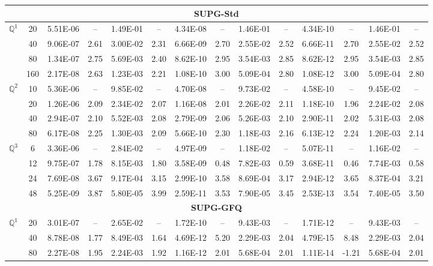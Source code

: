 \documentclass[a4paper,10pt]{article}
\begin{document}
\begin{table}
\begin{tabular}{c|c|cc|cc|cc|cc|cc|cc}
		\multicolumn{14}{c}{\textbf{SUPG-Std}} \\
		\hline
		$\mathbb{Q}^1$ & 20 & 5.51E-06 & --   & 1.49E-01 & --   & 4.34E-08 & --   & 1.46E-01 & --   & 4.34E-10 & --   & 1.46E-01 & --    \\
		& 40 & 9.06E-07 & 2.61 & 3.00E-02 & 2.31 & 6.66E-09 & 2.70 & 2.55E-02 & 2.52 & 6.66E-11 & 2.70 & 2.55E-02 & 2.52  \\
		& 80 & 1.34E-07 & 2.75 & 5.69E-03 & 2.40 & 8.62E-10 & 2.95 & 3.54E-03 & 2.85 & 8.62E-12 & 2.95 & 3.54E-03 & 2.85  \\
		& 160& 2.17E-08 & 2.63 & 1.23E-03 & 2.21 & 1.08E-10 & 3.00 & 5.09E-04 & 2.80 & 1.08E-12 & 3.00 & 5.09E-04 & 2.80  \\
		\hline
		$\mathbb{Q}^2$ & 10 & 5.36E-06 & --   & 9.85E-02 & --   & 4.70E-08  & --   & 9.73E-02 & --   & 4.58E-10 & --   & 9.45E-02 & --   \\
		& 20 & 1.26E-06 & 2.09 & 2.34E-02 & 2.07 & 1.16E-08  & 2.01 & 2.26E-02 & 2.11 & 1.18E-10 & 1.96 & 2.24E-02 & 2.08 \\
		& 40 & 2.94E-07 & 2.10 & 5.52E-03 & 2.08 & 2.79E-09  & 2.06 & 5.26E-03 & 2.10 & 2.90E-11 & 2.02 & 5.31E-03 & 2.08 \\
		& 80 & 6.17E-08 & 2.25 & 1.30E-03 & 2.09 & 5.66E-10  & 2.30 & 1.18E-03 & 2.16 & 6.13E-12 & 2.24 & 1.20E-03 & 2.14 \\
		\hline
		$\mathbb{Q}^3$ & 6  & 3.36E-06 & --   & 2.84E-02 & --   & 4.97E-09 & --   & 1.18E-02 & --   & 5.07E-11 & --   & 1.16E-02 & --   \\
		& 12 & 9.75E-07 & 1.78 & 8.15E-03 & 1.80 & 3.58E-09 & 0.48 & 7.82E-03 & 0.59 & 3.68E-11 & 0.46 & 7.74E-03 & 0.58 \\
		& 24 & 7.69E-08 & 3.67 & 9.17E-04 & 3.15 & 2.99E-10 & 3.58 & 8.69E-04 & 3.17 & 2.94E-12 & 3.65 & 8.37E-04 & 3.21 \\
		& 48 & 5.25E-09 & 3.87 & 5.80E-05 & 3.99 & 2.59E-11 & 3.53 & 7.90E-05 & 3.45 & 2.53E-13 & 3.54 & 7.40E-05 & 3.50 \\
		\hline
		\multicolumn{14}{c}{\textbf{SUPG-GFQ}} \\
		\hline
		$\mathbb{Q}^1$ & 20 & 3.01E-07 & --   & 2.65E-02 & --   & 1.72E-10 & --   & 9.43E-03 & --   & 1.71E-12 & --     & 9.43E-03 & --   \\
		& 40 & 8.78E-08 & 1.77 & 8.49E-03 & 1.64 & 4.69E-12 & 5.20 & 2.29E-03 & 2.04 & 4.79E-15 & 8.48   & 2.29E-03 & 2.04 \\
		& 80 & 2.27E-08 & 1.95 & 2.24E-03 & 1.92 & 1.16E-12 & 2.01 & 5.68E-04 & 2.01 & 1.11E-14 & -1.21  & 5.68E-04 & 2.01 \\

\end{tabular}
\end{table}
\end{document}
